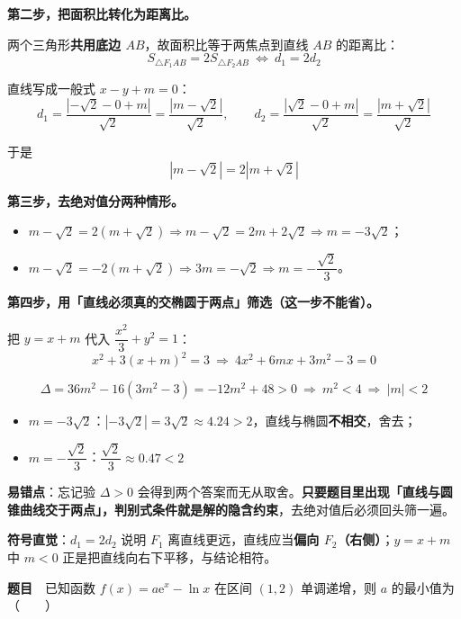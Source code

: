 \textbf{第二步，把面积比转化为距离比。}

两个三角形\textbf{共用底边 $AB$}，故面积比等于两焦点到直线 $AB$ 的距离比：
\[S_{\triangle F_1AB}=2S_{\triangle F_2AB}\ \iff\ d_1=2d_2\]

直线写成一般式 $x-y+m=0$：
\[d_1=\frac{\left|-\sqrt2-0+m\right|}{\sqrt2}=\frac{\left|m-\sqrt2\right|}{\sqrt2},\qquad d_2=\frac{\left|\sqrt2-0+m\right|}{\sqrt2}=\frac{\left|m+\sqrt2\right|}{\sqrt2}\]

于是
\[\left|m-\sqrt2\right|=2\left|m+\sqrt2\right|\]

\textbf{第三步，去绝对值分两种情形。}

\begin{itemize}
\item $m-\sqrt2=2\left(m+\sqrt2\right)\Rightarrow m-\sqrt2=2m+2\sqrt2\Rightarrow m=-3\sqrt2$；
\item $m-\sqrt2=-2\left(m+\sqrt2\right)\Rightarrow 3m=-\sqrt2\Rightarrow m=-\dfrac{\sqrt2}3$。
\end{itemize}

\textbf{第四步，用「直线必须真的交椭圆于两点」筛选（这一步不能省）。}

把 $y=x+m$ 代入 $\dfrac{x^{2}}3+y^{2}=1$：
\[x^{2}+3(x+m)^{2}=3\ \Longrightarrow\ 4x^{2}+6mx+3m^{2}-3=0\]

\[\Delta=36m^{2}-16\left(3m^{2}-3\right)=-12m^{2}+48>0\ \Longrightarrow\ m^{2}<4\ \Longrightarrow\ |m|<2\]

\begin{itemize}
\item $m=-3\sqrt2$：$\left|-3\sqrt2\right|=3\sqrt2\approx4.24>2$，直线与椭圆\textbf{不相交}，舍去；
\item $m=-\dfrac{\sqrt2}3$：$\dfrac{\sqrt2}3\approx0.47<2$ 
\end{itemize}


\begin{gktip}
\textbf{易错点}：忘记验 $\Delta>0$ 会得到两个答案而无从取舍。\textbf{只要题目里出现「直线与圆锥曲线交于两点」，判别式条件就是解的隐含约束}，去绝对值后必须回头筛一遍。

\textbf{符号直觉}：$d_1=2d_2$ 说明 $F_1$ 离直线更远，直线应当\textbf{偏向 $F_2$（右侧）}；$y=x+m$ 中 $m<0$ 正是把直线向右下平移，与结论相符。
\end{gktip}

\par\medskip


\textbf{题目}　已知函数 $f(x)=a\mathrm e^{x}-\ln x$ 在区间 $(1,2)$ 单调递增，则 $a$ 的最小值为（　　）

